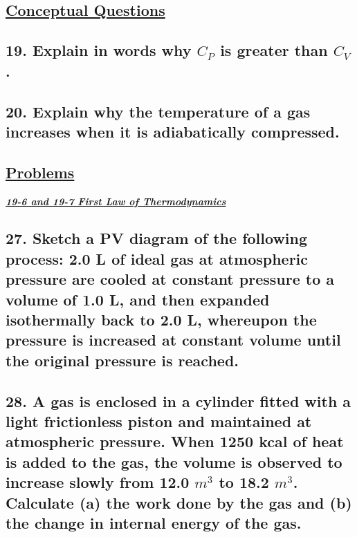 \documentclass{article}
\title{
    \vspace{2in}
    \textmd{\textbf{\hmwkTitle}} \\
    \vspace{0.5in}
    \textmd{\textbf{\hmwkClass}}\\
    \vspace{4in}
}
\author{\hmwkAuthorName}
\date{}
\begin{document}
\maketitle
\begin{center}
    \section*{\textbf{\underline {Conceptual Questions}}}
\end{center}
    \subsection*{19. Explain in words why $C_P$ is greater than $C_V$.}
    \vspace{3in}
    \subsection*{20. Explain why the temperature of a gas increases when it is adiabatically compressed.}
\newpage
\clearpage\shipout\null
\begin{center}
    \section*{\textbf{\underline {Problems}}}
\end{center}
\noindent \large{\textbf{\textit{\underline{19-6 and 19-7  First Law of Thermodynamics}}}} \\
    \subsection*{27. Sketch a PV diagram of the following process: 2.0 L of ideal gas at atmospheric pressure are cooled at constant pressure to a volume of 1.0 L, and then expanded isothermally back to 2.0 L, whereupon the pressure is increased at constant volume until the original pressure is reached.}
    \vspace{3in}
    \subsection*{28. A gas is enclosed in a cylinder fitted with a light frictionless piston and maintained at atmospheric pressure. When 1250 kcal of heat is added to the gas, the volume is observed to increase slowly from 12.0 $m^3$ to 18.2 $m^3$. Calculate (a) the work done by the gas and (b) the change in internal energy of the gas.}
    \newpage
\end{document}
